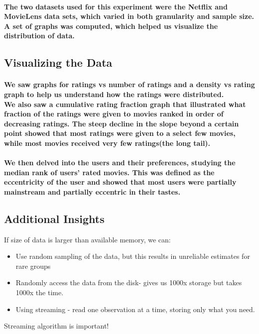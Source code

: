 \paragraph{The two datasets used for this experiment were the Netflix and MovieLens data sets, which varied in both granularity and sample size.\\
A set of graphs was computed, which helped us visualize the distribution of data.}

\subsection{Visualizing the Data}

\paragraph{We saw graphs for ratings vs number of ratings and a density vs rating graph to help us understand how the ratings were distributed. \\
We also saw a cumulative rating fraction graph that illustrated what fraction of the ratings were given to movies ranked in order of decreasing ratings. The steep decline in the slope beyond a certain point showed that most ratings were given to a select few movies, while most movies received very few ratings(the long tail).}

\paragraph{We then delved into the users and their preferences, studying the median rank of users' rated movies. This was defined as the eccentricity of the user and showed that most users were partially mainstream and partially eccentric in their tastes.}



\subsection{Additional Insights}
If size of data is larger than available memory, we can:
\begin{itemize}
  \item Use random sampling of the data, but this results in unreliable estimates for rare groups
  \item Randomly access the data from the disk- gives us 1000x storage but takes 1000x the time.
  \item Using streaming - read one observation at a time, storing only what you need.
\end{itemize}
Streaming algorithm is important!

